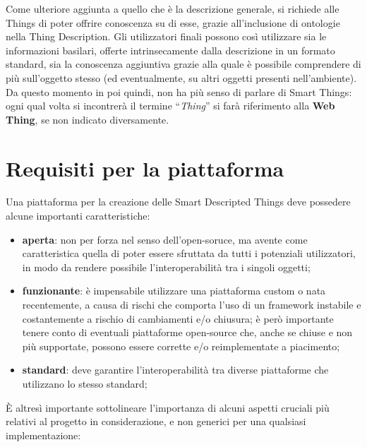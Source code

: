 \documentclass[12pt,a4paper,openright,oneside]{report}
\newcommand{\quotes}[1]{``#1''}
\begin{document}
Come ulteriore aggiunta a quello che è la descrizione generale, si richiede alle Things di poter offrire conoscenza su di esse, grazie all'inclusione di ontologie nella Thing Description. Gli utilizzatori finali possono così utilizzare sia le informazioni basilari, offerte intrinsecamente dalla descrizione in un formato standard, sia la conoscenza aggiuntiva grazie alla quale è possibile comprendere di più sull'oggetto stesso (ed eventualmente, su altri oggetti presenti nell'ambiente).\\

Da questo momento in poi quindi, non ha più senso di parlare di Smart Things: ogni qual volta si incontrerà il termine \quotes{\textit{Thing}} si farà riferimento alla \textbf{Web Thing}, se non indicato diversamente.

\section{Requisiti per la piattaforma}
\label{sec:iot_platform}
Una piattaforma per la creazione delle Smart Descripted Things deve possedere alcune importanti caratteristiche:

\begin{itemize}
	\setlength\itemsep{0em}
	\item \textbf{aperta}: non per forza nel senso dell'open-soruce, ma avente come caratteristica quella di poter essere sfruttata da tutti i potenziali utilizzatori, in modo da rendere possibile l'interoperabilità tra i singoli oggetti;

	\item \textbf{funzionante}: è impensabile utilizzare una piattaforma custom o nata recentemente, a causa di rischi che comporta l'uso di un framework instabile e costantemente a rischio di cambiamenti e/o chiusura; è però importante tenere conto di eventuali piattaforme open-source che, anche se chiuse e non più supportate, possono essere corrette e/o reimplementate a piacimento;
	
	\item \textbf{standard}: deve garantire l'interoperabilità tra diverse piattaforme che utilizzano lo stesso standard;
\end{itemize}

È altresì importante sottolineare l'importanza di alcuni aspetti cruciali più relativi al progetto in considerazione, e non generici per una qualsiasi implementazione:
\end{document}
